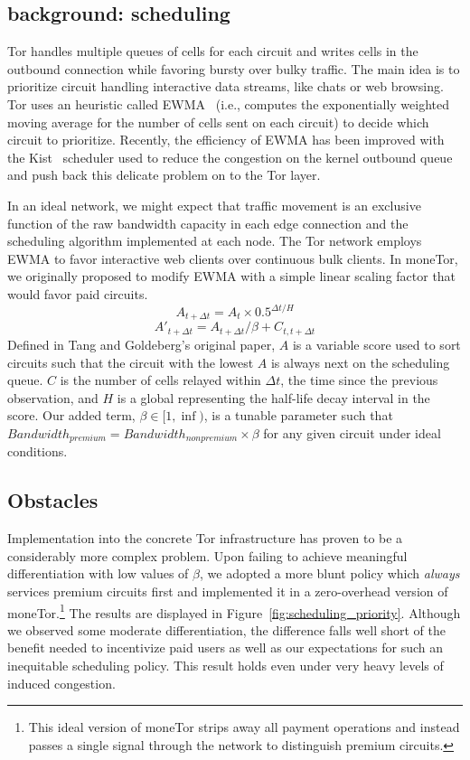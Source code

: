 \label{sec:scheduling}
\subsection{background: scheduling}

Tor handles multiple queues of cells for each circuit and writes cells in the
outbound connection while favoring bursty over bulky traffic. The main idea is
to prioritize circuit handling interactive data streams, like chats or web
browsing. Tor uses an heuristic called EWMA~\cite{tang2010improved} (i.e.,
computes the exponentially weighted moving average for the number of cells sent
on each circuit) to decide which circuit to prioritize. Recently, the efficiency
of EWMA has been improved with the Kist~\cite{jansen2014never} scheduler used to
reduce the congestion on the kernel outbound queue and push back this delicate
problem on to the Tor layer.

In an ideal network, we might expect that traffic movement is an exclusive
function of the raw bandwidth capacity in each edge connection and the
scheduling algorithm implemented at each node.  The Tor network employs EWMA to
favor interactive web clients over continuous bulk clients. In moneTor, we
originally proposed to modify EWMA with a simple linear scaling factor that
would favor paid circuits.
\begin{equation}
  A_{t + \Delta t} = A_t \times 0.5^{\Delta t/H}
\end{equation}
\begin{equation}
  A'_{t + \Delta t} = A_{t + \Delta t} / \beta + C_{t, t + \Delta t}
\end{equation}
Defined in Tang and Goldeberg's original paper, $A$ is a variable score used to
sort circuits such that the circuit with the lowest $A$ is always next on the
scheduling queue. $C$ is the number of cells relayed within $\Delta t$, the time
since the previous observation, and $H$ is a global representing the half-life
decay interval in the score. Our added term, $\beta \in [1, \inf)$, is a tunable
parameter such that $Bandwidth_{premium} = Bandwidth_{nonpremium} \times \beta$
for any given circuit under ideal conditions.

\subsection{Obstacles}

Implementation into the concrete Tor infrastructure has proven to be a
considerably more complex problem. Upon failing to achieve meaningful
differentiation with low values of $\beta$, we adopted a more blunt policy which
\emph{always} services premium circuits first and implemented it in a
zero-overhead version of moneTor.\footnote{This ideal version of moneTor strips
  away all payment operations and instead passes a single signal through the
  network to distinguish premium circuits.} The results are displayed in
Figure~\ref{fig:scheduling_priority}. Although we observed some moderate
differentiation, the difference falls well short of the benefit needed to
incentivize paid users as well as our expectations for such an inequitable
scheduling policy. This result holds even under very heavy levels of induced
congestion.


